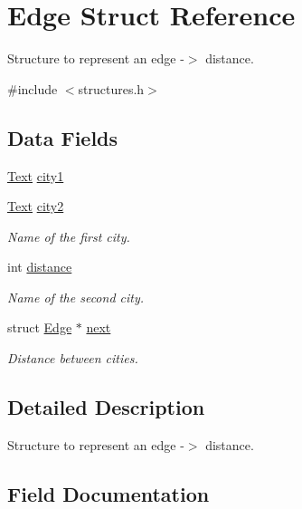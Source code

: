 \hypertarget{struct_edge}{}\section{Edge Struct Reference}
\label{struct_edge}


Structure to represent an edge -\/$>$ distance.  




{\ttfamily \#include $<$structures.\+h$>$}

\subsection*{Data Fields}
\begin{DoxyCompactItemize}
\item 
\mbox{\hyperlink{structures_8h_a40c368b38c251b762d65bf9a9703c4b0}{Text}} \mbox{\hyperlink{struct_edge_aa1d0bc409d77879bcf3ad27705c717f6}{city1}}
\item 
\mbox{\hyperlink{structures_8h_a40c368b38c251b762d65bf9a9703c4b0}{Text}} \mbox{\hyperlink{struct_edge_ac354e2207d98056e2aa26e4d87931b7b}{city2}}
\begin{DoxyCompactList}\small\item\em Name of the first city. \end{DoxyCompactList}\item 
int \mbox{\hyperlink{struct_edge_afb9412686cd344ad61757c1c19ba8a87}{distance}}
\begin{DoxyCompactList}\small\item\em Name of the second city. \end{DoxyCompactList}\item 
struct \mbox{\hyperlink{struct_edge}{Edge}} $\ast$ \mbox{\hyperlink{struct_edge_a556c4bee2736c58d0261c100ee43b50d}{next}}
\begin{DoxyCompactList}\small\item\em Distance between cities. \end{DoxyCompactList}\end{DoxyCompactItemize}


\subsection{Detailed Description}
Structure to represent an edge -\/$>$ distance. 

\subsection{Field Documentation}
\mbox{\label{struct_edge_aa1d0bc409d77879bcf3ad27705c717f6}} 
